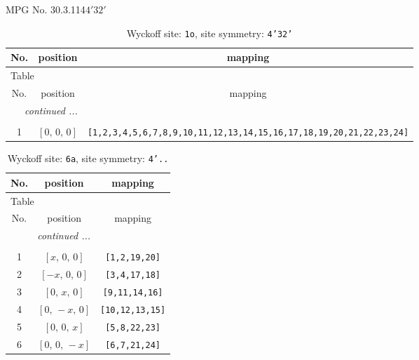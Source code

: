 \documentclass[fleqn,8pt]{jsarticle}
\begin{document}
\setcounter{MaxMatrixCols}{32}

\renewcommand{\tablename}{Table~}
\renewcommand{\figurename}{Figure~}
\begin{center}
\LARGE
MPG No. 30.3.114\quad$4'32'$
\end{center}
\renewcommand{\arraystretch}{1.2}
\begin{longtable}{ccc}
\caption{Wyckoff site: {\tt 1o}, site symmetry: {\tt 4'32'}}
 \\
 \hline \hline
No. & position & mapping \\ \hline \endfirsthead

\multicolumn{2}{l}{\tablename\ \thetable{}} \\
 \hline \hline
No. & position & mapping \\ \hline \endhead

 \hline \hline
\multicolumn{2}{r}{\footnotesize\it continued ...} \\ \endfoot

 \hline \hline
\multicolumn{2}{r}{} \\ \endlastfoot

1 & $\left[ 0,\, 0,\, 0 \right]$ & {\tt [1,2,3,4,5,6,7,8,9,10,11,12,13,14,15,16,17,18,19,20,21,22,23,24]} \\
\end{longtable}
\renewcommand{\arraystretch}{1.2}
\begin{longtable}{ccc}
\caption{Wyckoff site: {\tt 6a}, site symmetry: {\tt 4'..}}
 \\
 \hline \hline
No. & position & mapping \\ \hline \endfirsthead

\multicolumn{2}{l}{\tablename\ \thetable{}} \\
 \hline \hline
No. & position & mapping \\ \hline \endhead

 \hline \hline
\multicolumn{2}{r}{\footnotesize\it continued ...} \\ \endfoot

 \hline \hline
\multicolumn{2}{r}{} \\ \endlastfoot

1 & $\left[ x,\, 0,\, 0 \right]$ & {\tt [1,2,19,20]} \\ \hline
2 & $\left[ - x,\, 0,\, 0 \right]$ & {\tt [3,4,17,18]} \\ \hline
3 & $\left[ 0,\, x,\, 0 \right]$ & {\tt [9,11,14,16]} \\ \hline
4 & $\left[ 0,\, - x,\, 0 \right]$ & {\tt [10,12,13,15]} \\ \hline
5 & $\left[ 0,\, 0,\, x \right]$ & {\tt [5,8,22,23]} \\ \hline
6 & $\left[ 0,\, 0,\, - x \right]$ & {\tt [6,7,21,24]} \\
\end{longtable}
\end{document}
